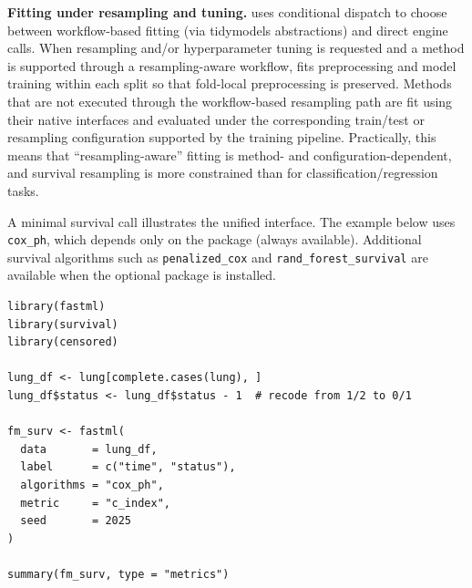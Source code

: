 \textbf{Fitting under resampling and tuning.}
 uses conditional dispatch to choose between workflow-based fitting (via tidymodels abstractions) and direct engine calls. When resampling and/or hyperparameter tuning is requested and a method is supported through a resampling-aware workflow,  fits preprocessing and model training within each split so that fold-local preprocessing is preserved. Methods that are not executed through the workflow-based resampling path are fit using their native interfaces and evaluated under the corresponding train/test or resampling configuration supported by the training pipeline. Practically, this means that ``resampling-aware'' fitting is method- and configuration-dependent, and survival resampling is more constrained than for classification/regression tasks.

A minimal survival call illustrates the unified interface. The example below uses \texttt{cox\_ph}, which depends only on the  package (always available). Additional survival algorithms such as \texttt{penalized\_cox} and \texttt{rand\_forest\_survival} are available when the optional  package is installed.

\begin{verbatim}
library(fastml)
library(survival)
library(censored)

lung_df <- lung[complete.cases(lung), ]
lung_df$status <- lung_df$status - 1  # recode from 1/2 to 0/1

fm_surv <- fastml(
  data       = lung_df,
  label      = c("time", "status"),
  algorithms = "cox_ph",
  metric     = "c_index",
  seed       = 2025
)

summary(fm_surv, type = "metrics")
\end{verbatim}


